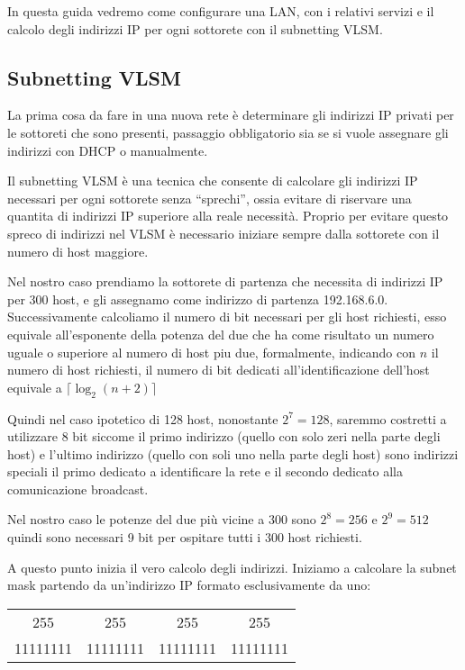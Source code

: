 In questa guida vedremo come configurare una LAN, con i relativi servizi e il calcolo degli indirizzi IP per ogni sottorete con il subnetting VLSM.

\subsection{Subnetting VLSM}
La prima cosa da fare in una nuova rete è determinare gli indirizzi IP privati per le sottoreti che sono presenti, passaggio obbligatorio sia se si vuole assegnare gli indirizzi con DHCP o manualmente.

Il subnetting VLSM è una tecnica che consente di calcolare gli indirizzi IP necessari per ogni sottorete senza ``sprechi'', ossia evitare di riservare una quantita di indirizzi IP superiore alla reale necessità.
Proprio per evitare questo spreco di indirizzi nel VLSM è necessario iniziare sempre dalla sottorete con il numero di host maggiore.

Nel nostro caso prendiamo la sottorete di partenza che necessita di indirizzi IP per 300 host, e gli assegnamo come indirizzo di partenza 192.168.6.0. Successivamente calcoliamo il numero di bit necessari per gli host richiesti, esso equivale all’esponente della potenza del due che ha come risultato un numero uguale o superiore al numero di host piu due, formalmente, indicando con $n$ il numero di host richiesti, il numero di bit dedicati all'identificazione dell'host equivale a $\lceil \log_2 (n + 2) \rceil$

Quindi nel caso ipotetico di 128 host, nonostante $2^7 = 128$, saremmo costretti a utilizzare 8 bit siccome il primo indirizzo (quello con solo zeri nella parte degli host) e l'ultimo indirizzo (quello con soli uno nella parte degli host) sono indirizzi speciali il primo dedicato a identificare la rete e il secondo dedicato alla comunicazione broadcast.

Nel nostro caso le potenze del due più vicine a $300$ sono $2^8 = 256$ e $2^9 = 512$ quindi sono necessari 9 bit per ospitare tutti i $300$ host richiesti.

A questo punto inizia il vero calcolo degli indirizzi. Iniziamo a calcolare la subnet mask partendo da un'indirizzo IP formato esclusivamente da uno:

\begin{center}
    \begin{tabular}{c@{.}c@{.}c@{.}c}
        255 & 255 & 255 & 255\\
        11111111 & 11111111 & 11111111 & 11111111
    \end{tabular}
\end{center}

